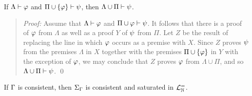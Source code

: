 \begin{Lthm} \label{lemma:prcut}
  If $\Lambda \vdash \varphi$ and $\Pi\cup\lbrace\varphi\rbrace \vdash \psi$, then $\Lambda\cup\Pi \vdash \psi$. 
\end{Lthm}

\begin{quote} 
  \textit{Proof:} Assume that $\Lambda \vdash \varphi$ and $\Pi\cup{\ensuremath{\varphi}} \vdash \psi$.
  It follows that there is a proof of $\varphi$ from $\Lambda$ as well as a proof $Y$ of $\psi$ from $\Pi$. 
  Let $Z$ be the result of replacing the line in which $\varphi$ occurs as a premise with $X$.
  Since $Z$ proves $\psi$ from the premises $\Lambda$ in $X$ together with the premises $\Pi\cup\lbrace\varphi\rbrace$ in $Y$ with the exception of $\varphi$, we may conclude that $Z$ proves $\varphi$ from $\Lambda\cup\Pi$, and so $\Lambda\cup\Pi\vdash\psi$.
  \qed
\end{quote}





\begin{Lthm} \label{lemma:sat}
  If $\Gamma$ is consistent, then $\Sigma_{\Gamma}$ is consistent and saturated in $\mathcal{L}^{=}_{\mathbb{N}}$. 
\end{Lthm}

